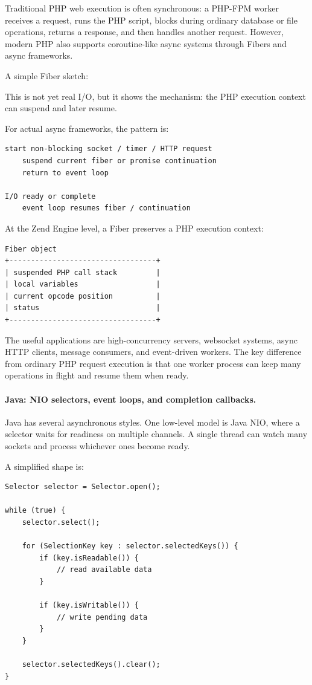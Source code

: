 Traditional PHP web execution is often synchronous: a PHP-FPM worker receives a request, runs the PHP script, blocks during ordinary database or file operations, returns a response, and then handles another request. However, modern PHP also supports coroutine-like async systems through Fibers and async frameworks.

A simple Fiber sketch:

This is not yet real I/O, but it shows the mechanism: the PHP execution context can suspend and later resume.

For actual async frameworks, the pattern is:

\begin{verbatim}
start non-blocking socket / timer / HTTP request
    suspend current fiber or promise continuation
    return to event loop

I/O ready or complete
    event loop resumes fiber / continuation
\end{verbatim}

At the Zend Engine level, a Fiber preserves a PHP execution context:

\begin{verbatim}
Fiber object
+----------------------------------+
| suspended PHP call stack         |
| local variables                  |
| current opcode position          |
| status                           |
+----------------------------------+
\end{verbatim}

The useful applications are high-concurrency servers, websocket systems, async HTTP clients, message consumers, and event-driven workers. The key difference from ordinary PHP request execution is that one worker process can keep many operations in flight and resume them when ready.

\paragraph{Java: NIO selectors, event loops, and completion callbacks.}

Java has several asynchronous styles. One low-level model is Java NIO, where a selector waits for readiness on multiple channels. A single thread can watch many sockets and process whichever ones become ready.

A simplified shape is:

\begin{verbatim}
Selector selector = Selector.open();

while (true) {
    selector.select();

    for (SelectionKey key : selector.selectedKeys()) {
        if (key.isReadable()) {
            // read available data
        }

        if (key.isWritable()) {
            // write pending data
        }
    }

    selector.selectedKeys().clear();
}
\end{verbatim}

